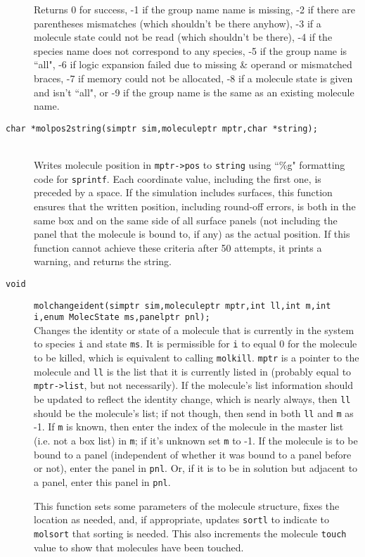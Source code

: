 \documentclass {book}
\newcommand {\ttt} {\texttt}
\begin{document}
\begin{description}
Returns 0 for success, -1 if the group name name is missing, -2 if there are parentheses mismatches (which shouldn't be there anyhow), -3 if a molecule state could not be read (which shouldn't be there), -4 if the species name does not correspond to any species, -5 if the group name is ``all", -6 if logic expansion failed due to missing \& operand or mismatched braces, -7 if memory could not be allocated, -8 if a molecule state is given and isn't ``all", or -9 if the group name is the same as an existing molecule name.

\item[\ttt{char *molpos2string(simptr sim,moleculeptr mptr,char *string);}]
\hfill \\
Writes molecule position in \ttt{mptr->pos} to \ttt{string} using ``\%g" formatting code for \ttt{sprintf}. Each coordinate value, including the first one, is preceded by a space. If the simulation includes surfaces, this function ensures that the written position, including round-off errors, is both in the same box and on the same side of all surface panels (not including the panel that the molecule is bound to, if any) as the actual position. If this function cannot achieve these criteria after 50 attempts, it prints a warning, and returns the string.

\item[\ttt{void}]
\ttt{molchangeident(simptr sim,moleculeptr mptr,int ll,int m,int i,enum MolecState ms,panelptr pnl);} \\
Changes the identity or state of a molecule that is currently in the system to species \ttt{i} and state \ttt{ms}. It is permissible for \ttt{i} to equal 0 for the molecule to be killed, which is equivalent to calling \ttt{molkill}. \ttt{mptr} is a pointer to the molecule and \ttt{ll} is the list that it is currently listed in (probably equal to \ttt{mptr->list}, but not necessarily). If the molecule's list information should be updated to reflect the identity change, which is nearly always, then \ttt{ll} should be the molecule's list; if not though, then send in both \ttt{ll} and \ttt{m} as -1. If \ttt{m} is known, then enter the index of the molecule in the master list (i.e. not a box list) in \ttt{m}; if it's unknown set \ttt{m} to -1. If the molecule is to be bound to a panel (independent of whether it was bound to a panel before or not), enter the panel in \ttt{pnl}. Or, if it is to be in solution but adjacent to a panel, enter this panel in \ttt{pnl}.

This function sets some parameters of the molecule structure, fixes the location as needed, and, if appropriate, updates \ttt{sortl} to indicate to \ttt{molsort} that sorting is needed. This also increments the molecule \ttt{touch} value to show that molecules have been touched.


\end{description}
\end{document}
